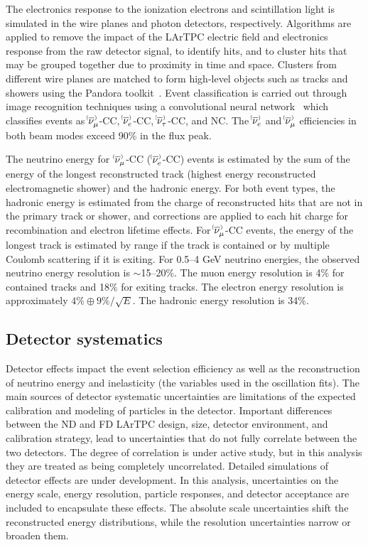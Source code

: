 The electronics response to the ionization electrons and scintillation light is simulated in the wire planes and photon detectors, respectively. Algorithms are applied to remove the impact of the LArTPC electric field and electronics response from the raw detector signal, to identify hits, and to cluster hits that may be grouped together due to proximity in time and space. Clusters from different wire planes are matched to form high-level objects such as tracks and showers using the Pandora toolkit~\cite{Marshall:2015rfa,Acciarri:2017hat}. Event classification is carried out through image recognition techniques using a convolutional neural network~\cite{cvn_paper} which classifies events as $\nu^{\bracketbar}_{\mu}$-CC, $\nu^{\bracketbar}_{e}$-CC, $\nu^{\bracketbar}_{\tau}$-CC, and NC. The $\nue^{\bracketbar}$ and $\numu^{\bracketbar}$ efficiencies in both beam modes exceed 90\% in the flux peak.

The neutrino energy for $\,\nu^{\bracketbar}_{\mu}$-CC ($\,\nu^{\bracketbar}_{e}$-CC) events is estimated by the sum of the energy of the longest reconstructed track (highest energy reconstructed electromagnetic shower) and the hadronic energy. For both event types, the hadronic energy is estimated from the charge of reconstructed hits that are not in the primary track or shower, and corrections are applied to each hit charge for recombination and electron lifetime effects. For $\nu^{\bracketbar}_{\mu}$-CC events, the energy of the longest track is estimated by range if the track is contained or by multiple Coulomb scattering if it is exiting. For 0.5--4 GeV neutrino energies, the observed neutrino energy resolution is $\sim$15--20\%. The muon energy resolution is 4\% for contained tracks and 18\% for exiting tracks. The electron energy resolution is approximately $4\% \oplus 9\%/\sqrt{E}$. The hadronic energy resolution is 34\%.

\subsection{Detector systematics}
Detector effects impact the event selection efficiency as well as the reconstruction of neutrino energy and inelasticity (the variables used in the oscillation fits). The main sources of detector systematic uncertainties are limitations of the expected calibration and modeling of particles in the detector. Important differences between the ND and FD LArTPC design, size, detector environment, and calibration strategy, lead to uncertainties that do not fully correlate between the two detectors. The degree of correlation is under active study, but in this analysis they are treated as being completely uncorrelated. Detailed simulations of detector effects are under development. In this analysis, uncertainties on the energy scale, energy resolution, particle responses, and detector acceptance are included to encapsulate these effects. The absolute scale uncertainties shift the reconstructed energy distributions, while the resolution uncertainties narrow or broaden them.

